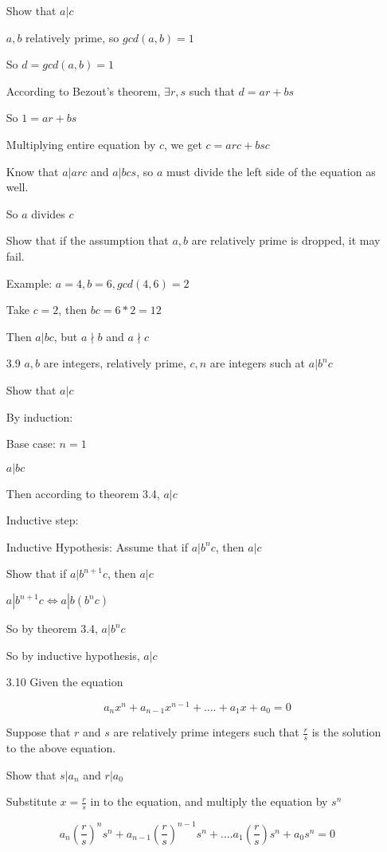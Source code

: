 \documentclass[11pt]{article}
\begin{document}
\begin{itemize}
  Show that $a | c$

  $a,b$ relatively prime, so $gcd(a,b) = 1$

  So $d = gcd(a,b) = 1$

  According to Bezout's theorem, $\exists r,s$ such that $d = ar + bs$

  So $1 = ar + bs$

  Multiplying entire equation by $c$, we get $c = arc + bsc$

  Know that $a | arc$ and $a | bcs$, so $a$ must divide the left side of the equation as well.

  So $a$ divides $c$

  Show that if the assumption that $a,b$ are relatively prime is dropped, it may fail.

  Example: $a = 4, b = 6, gcd(4,6) = 2$

  Take $c = 2$, then $bc = 6*2 = 12$

  Then $a | bc$, but $a\nmid b$ and $a\nmid c$
\item[3.9]
  $a, b$ are integers, relatively prime, $c,n$ are integers such at $a | b^n c$

  Show that $a | c$

  By induction:

  Base case: $n = 1$


  $a | bc$

  Then according to theorem 3.4, $a | c$

  Inductive step:

  Inductive Hypothesis: Assume that if $a | b^n c$, then $a | c$

  Show that if $a | b^{n+1} c$, then $a | c$

  $a | b^{n+1} c \iff a | b(b^n c)$

  So by theorem 3.4, $a | b^n c$

  So by inductive hypothesis, $a | c$
\item[3.10]
  Given the equation

  $$a_n x^n + a_{n-1}x^{n-1} + .... + a_1x + a_0 = 0$$

  Suppose that $r$ and $s$ are relatively prime integers such that $\frac{r}{s}$ is the solution to the above equation.

  Show that $s | a_n$ and $r | a_0$

  Substitute $x = \frac{r}{s}$ in to the equation, and multiply the equation by $s^n$

  $$a_n(\frac{r}{s})^n s^n + a_{n-1}(\frac{r}{s})^{n-1} s^n + .... a_1 (\frac{r}{s}) s^n + a_0 s^n = 0$$


\end{itemize}
\end{document}
